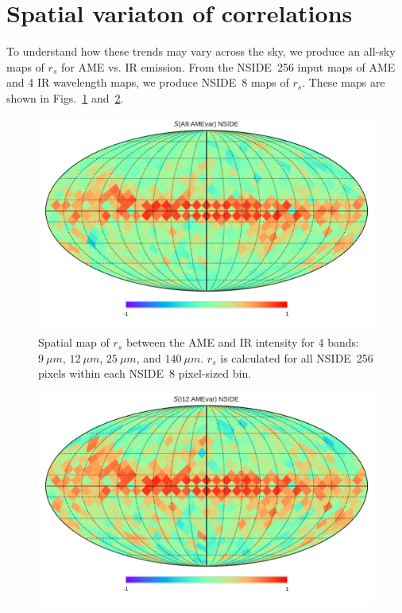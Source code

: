  \section{Spatial variaton of correlations}
    To understand how these trends may vary across the sky, we produce an all-sky maps of $r_{s}$ for AME vs. IR emission. From the NSIDE~256 input maps of AME and 4 IR wavelength maps, we produce NSIDE~8 maps of $r_{s}$. These maps are shown in Figs.~\ref{fig:Spearman_Map_nside8_AMEtoIR_A9} and~\ref{fig:Spearman_Map_nside8_AMEtoIR_I12}.
      \begin{figure}
        \includegraphics[width=\textwidth]{../Plots/Allsky_Corr/Spearman_Map_nside8_A9toAMEvar.pdf}
        \centering
        \caption{Spatial map of $r_{s}$ between the AME and IR intensity for 4 bands:$9~\mu{}m$, $12~\mu{}m$, $25~\mu{}m$, and $140~\mu{}m$. $r_{s}$ is calculated for all NSIDE~256 pixels within each NSIDE~8 pixel-sized bin.}
        \label{fig:Spearman_Map_nside8_AMEtoIR_A9}
      \end{figure}
      \begin{figure}
        \includegraphics[width=\textwidth]{../Plots/Allsky_Corr/Spearman_Map_nside8_I12toAMEvar.pdf}
        \centering
        \caption{}
        \label{fig:Spearman_Map_nside8_AMEtoIR_I12}
      \end{figure}
